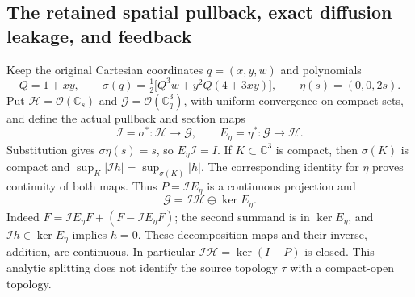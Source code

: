 \subsection{The retained spatial pullback, exact diffusion leakage, and feedback}
\label{sec:cq-spatial-diffusion-splitting}

Keep the original Cartesian coordinates $q=(x,y,w)$ and polynomials
\[
 Q=1+xy,\qquad
 \sigma(q)=\tfrac12\bigl[Q^3w+y^2Q(4+3xy)\bigr],\qquad
 \eta(s)=(0,0,2s).
\]
Put $\mathscr H=\mathcal O(\mathbb C_s)$ and
$\mathscr G=\mathcal O(\mathbb C_q^3)$, with uniform convergence on compact
sets, and define the actual pullback and section maps
\[
 \mathcal I =\sigma^*:\mathscr H\longrightarrow\mathscr G,\qquad
 E_\eta=\eta^*:\mathscr G\longrightarrow\mathscr H.
\]
Substitution gives $\sigma\eta(s)=s$, so $E_\eta \mathcal I =I$.
If $K\subset\mathbb C^3$ is compact, then $\sigma(K)$ is compact and
$\sup_K|\mathcal I h|=\sup_{\sigma(K)}|h|$. The corresponding identity for $\eta$
proves continuity of both maps. Thus $P=\mathcal I E_\eta$ is a continuous
projection and
\begin{equation}
 \mathscr G=\mathcal I \mathscr H\oplus\ker E_\eta .
 \label{eq:cq-spatial-splitting}
\end{equation}
Indeed $F=\mathcal I E_\eta F+(F-\mathcal I E_\eta F)$; the second summand is in
$\ker E_\eta$, and $\mathcal I h\in\ker E_\eta$ implies $h=0$.
These decomposition maps and their inverse, addition, are continuous.
In particular $\mathcal I \mathscr H=\ker(I-P)$ is closed. This analytic splitting
does not identify the source topology $\tau$ with a compact-open topology.

